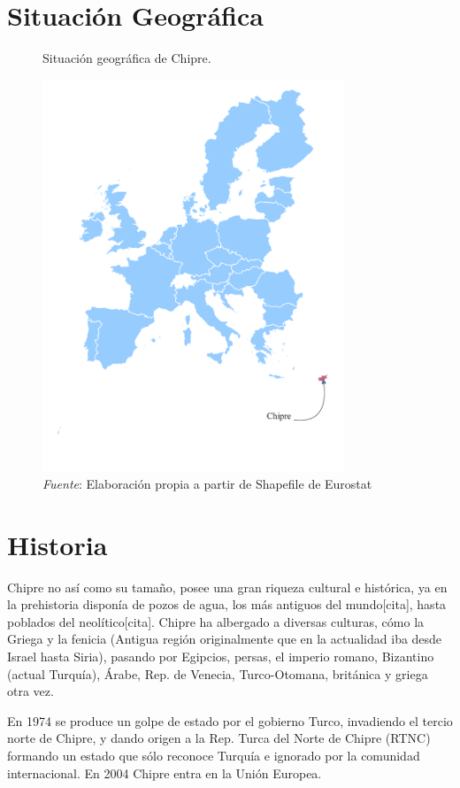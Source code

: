 \documentclass[a4paper,openright,12pt]{book}
\begin{document}
\section{Situación Geográfica}


\begin{figure}[htb]
    \centering
    \caption{Situación geográfica de Chipre.}
    \includegraphics[width=9cm]{mapa}
    \caption*{\textit{Fuente}: Elaboración propia a partir de Shapefile de Eurostat}
    \label{fig1}
\end{figure}

\section{Historia}

Chipre no así como su tamaño, posee una gran riqueza cultural e histórica, ya en la prehistoria disponía de pozos de agua, los más antiguos del mundo[cita], hasta poblados del neolítico[cita]. Chipre ha albergado a diversas culturas, cómo la Griega y la fenicia (Antigua región originalmente que en la actualidad iba desde Israel hasta Siria), pasando por Egipcios, persas, el imperio romano, Bizantino (actual Turquía), Árabe, Rep. de Venecia, Turco-Otomana, británica y griega otra vez.\cite{ChipreWi15:online}

En 1974 se produce un golpe de estado por el gobierno Turco, invadiendo el tercio norte de Chipre, y dando origen a la Rep. Turca del Norte de Chipre (RTNC) formando un estado que sólo reconoce Turquía e ignorado por la comunidad internacional. En 2004 Chipre entra en la Unión Europea. \cite{ICEXEspa12:online}
\end{document}
